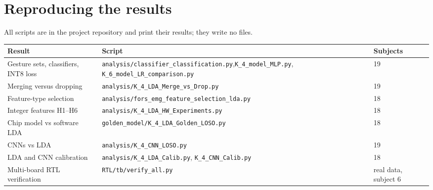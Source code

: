 \documentclass[11pt,a4paper]{article}
\begin{document}
\appendix
\section{Reproducing the results}
All scripts are in the project repository and print their results; they write no files.
\begin{center}\small
\begin{adjustbox}{max width=\textwidth}
\begin{tabular}{p{4.6cm}p{8.6cm}l}\toprule
Result & Script & Subjects\\\midrule
Gesture sets, classifiers, INT8 loss & \texttt{analysis/classifier\_classification.py},\newline \texttt{K\_4\_model\_MLP.py}, \texttt{K\_6\_model\_LR\_comparison.py} & 19\\
Merging versus dropping & \texttt{analysis/K\_4\_LDA\_Merge\_vs\_Drop.py} & 19\\
Feature-type selection & \texttt{analysis/fors\_emg\_feature\_selection\_lda.py} & 18\\
Integer features H1--H6 & \texttt{analysis/K\_4\_LDA\_HW\_Experiments.py} & 18\\
Chip model vs software LDA & \texttt{golden\_model/K\_4\_LDA\_Golden\_LOSO.py} & 18\\
CNNs vs LDA & \texttt{analysis/K\_4\_CNN\_LOSO.py} & 19\\
LDA and CNN calibration & \texttt{analysis/K\_4\_LDA\_Calib.py}, \texttt{K\_4\_CNN\_Calib.py} & 18\\
Multi-board RTL verification & \texttt{RTL/tb/verify\_all.py} & real data, subject 6\\\bottomrule
\end{tabular}
\end{adjustbox}
\end{center}
\end{document}
